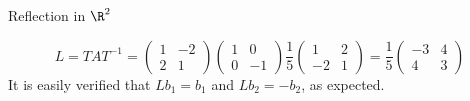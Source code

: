\documentclass[smaller,hyperref={CJKbookmarks=true}]{beamer}
\begin{document}
\begin{frame}{Reflection in $\R^2$}
\begin{spacing}{1}
\[L=TAT^{-1}=\begin{pmatrix}
               1 & -2 \\
               2 & 1
             \end{pmatrix}\begin{pmatrix}
                            1 & 0 \\
                            0 & -1
                          \end{pmatrix}\frac{1}{5}\begin{pmatrix}
                                                    1 &2 \\
                                                    -2 & 1
                                                  \end{pmatrix}=\frac{1}{5}\begin{pmatrix}
                                                                             -3 &4 \\
                                                                             4 & 3
                                                                           \end{pmatrix}\]
It is easily verified that $Lb_1=b_1$ and $Lb_2=-b_2$, as expected.
\end{spacing}
\end{frame}
\end{document}
